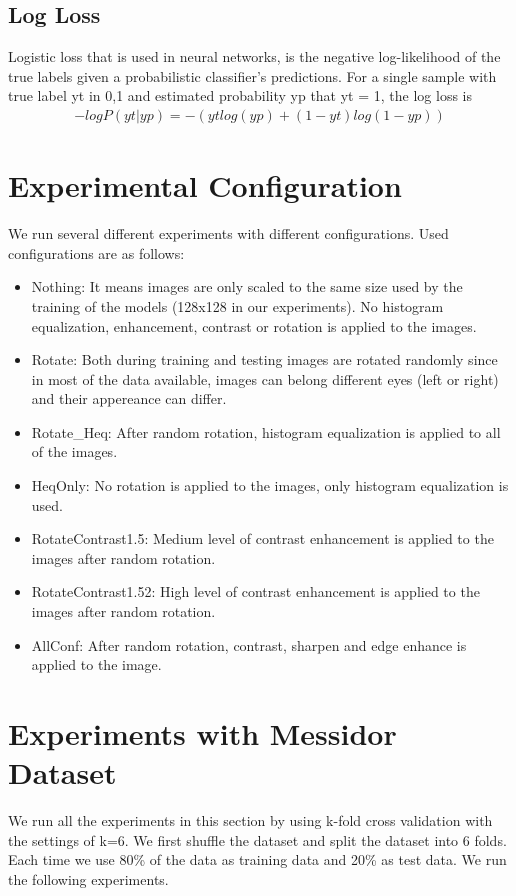 \subsection{Log Loss}
Logistic loss that is used in neural networks, is the negative log-likelihood of the true labels given a probabilistic classifier’s predictions. For a single sample with true label yt in {0,1} and estimated probability yp that yt = 1, the log loss is
\begin{align*}
    -log P(yt|yp) = -(yt log(yp) + (1 - yt) log(1 - yp))  
\end{align*}

\section{Experimental Configuration}
We run several different experiments with different configurations. Used configurations are as follows:

\begin{itemize}
    \item Nothing: It means images are only scaled to the same size used by the training of the models (128x128 in our experiments). No histogram equalization, enhancement, contrast or rotation is applied to the images. 
    \item Rotate: Both during training and testing images are rotated randomly since in most of the data available, images can belong different eyes (left or right) and their appereance can differ. 
    \item Rotate\_Heq: After random rotation, histogram equalization is applied to all of the images. 
    \item HeqOnly: No rotation is applied to the images, only histogram equalization is used. 
    \item RotateContrast1.5: Medium level of contrast enhancement is applied to the images after random rotation.
    \item RotateContrast1.52: High level of contrast enhancement is applied to the images after random rotation.
    \item AllConf: After random rotation, contrast, sharpen and edge enhance is applied to the image.
\end{itemize}

\section{Experiments with Messidor Dataset}
We run all the experiments in this section by using k-fold cross validation with the settings of k=6. We first shuffle the dataset and split the dataset into 6 folds. Each time we use 80\% of the data as training data and 20\% as test data. We run the following experiments.

